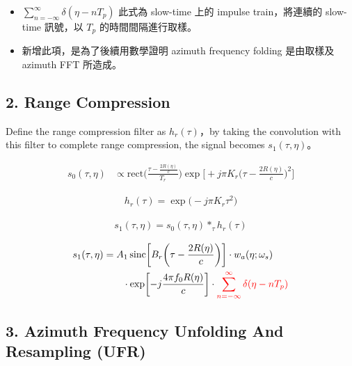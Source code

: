 \documentclass[10pt]{article}
\providecommand{\tightlist}{%
  \setlength{\itemsep}{0pt}\setlength{\parskip}{0pt}}
\begin{document}
\begin{itemize}
\tightlist
\item
  \(\sum_{n=-\infty}^{\infty}\delta(\eta-nT_p)\) 此式為 slow-time 上的
  impulse train，將連續的 slow-time 訊號，以 \(T_p\)
  的時間間隔進行取樣。
\item
  新增此項，是為了後續用數學證明 azimuth frequency folding 是由取樣及
  azimuth FFT 所造成。
\end{itemize}

\hypertarget{range-compression}{%
\subsection{2. Range Compression}\label{range-compression}}

Define the range compression filter as \(h_r(\tau)\)，by taking the convolution with this filter to complete range compression, the signal becomes \(s_1(\tau,\eta)\)。

\begin{equation}
\begin{aligned}
s_0(\tau,\eta)
&\propto
\mathrm{rect}\biggl(\frac{\tau-\frac{2R(\eta)}{c}}{T_r}\biggr)
\exp\biggl[+j\pi K_r\biggl(\tau-\frac{2R(\eta)}{c}\biggr)^2\biggr]
\end{aligned}
\end{equation}

\begin{equation}
\begin{aligned}
h_r(\tau)=\exp\bigl(-j\pi K_r\tau^2\bigr)
\end{aligned}
\end{equation}

\begin{equation}
\begin{aligned}
s_1(\tau,\eta)=s_0(\tau,\eta)*_\tau h_r(\tau)
\end{aligned}
\end{equation}

\begin{equation}
\begin{aligned}
s_1(\tau,\eta)
&=
A_1\,
\mathrm{sinc}\biggl[ B_r\biggl( \tau-\frac{2R(\eta)}{c} \biggr) \biggr]
\cdot w_a(\eta;\omega_s)\\
&\qquad \cdot \exp\biggl[ -j\frac{4\pi f_0R(\eta)}{c} \biggr]
\cdot {\color{red}{\sum_{n=-\infty}^{\infty}\delta(\eta-nT_p)}}
\end{aligned}
\end{equation}

\hypertarget{azimuth-frequency-unfolding-and-resampling-ufr}{%
\subsection{3. Azimuth Frequency Unfolding And Resampling
(UFR)}\label{azimuth-frequency-unfolding-and-resampling-ufr}}
\end{document}
